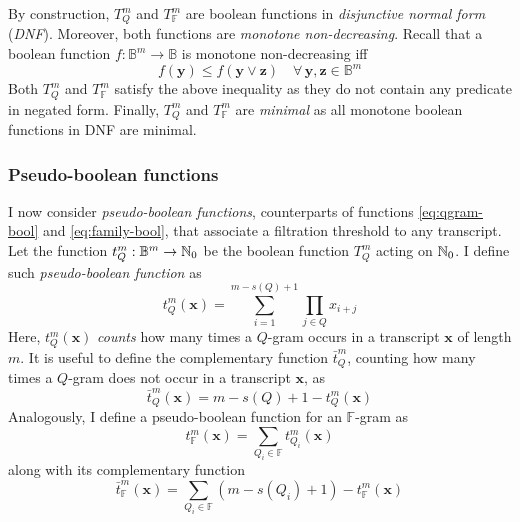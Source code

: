 By construction, $T_{Q}^{m}$ and $T_{\mathbb{F}}^{m}$ are boolean functions in \emph{disjunctive normal form} (\emph{DNF}).
Moreover, both functions are \emph{monotone non-decreasing}.
Recall that a boolean function $f : \mathbb{B}^m \rightarrow \mathbb{B}$ is monotone non-decreasing iff 
\begin{equation}
\label{eq:monotone-non-decreasing}
f(\mathbf{y}) \leq f(\mathbf{y} \vee \mathbf{z}) \quad \forall \, \mathbf{y}, \mathbf{z} \in \mathbb{B}^m
\end{equation}
Both $T_{Q}^{m}$ and $T_{\mathbb{F}}^{m}$ satisfy the above inequality as they do not contain any predicate in negated form.
Finally, $T_{Q}^{m}$ and $T_{\mathbb{F}}^{m}$ are \emph{minimal} as all monotone boolean functions in DNF are minimal.

\subsubsection{Pseudo-boolean functions}

I now consider \emph{pseudo-boolean functions}, counterparts of functions \ref{eq:qgram-bool} and \ref{eq:family-bool}, that associate a filtration threshold to any transcript.
Let the function $t_{Q}^{m}: \mathbb {B}^m \rightarrow \mathbb {N}_0$ be the boolean function $T_{Q}^{m}$ acting on $\mathbb {N}_0$.
I define such \emph{pseudo-boolean function} as
\begin{equation}
\label{eq:qgram-pseudo}
t_{Q}^{m}(\mathbf{x}) = \sum_{i=1}^{m-s(Q)+1} \prod_{j \in Q} x_{i+j}
\end{equation}
Here, $t_{Q}^{m}(\mathbf{x})$ \emph{counts} how many times a $Q$-gram occurs in a transcript $\mathbf{x}$ of length $m$.
It is useful to define the complementary function $\bar{t}_{Q}^{m}$, counting how many times a $Q$-gram does not occur in a transcript $\mathbf{x}$, as
\begin{equation}
\label{eq:qgram-pseudoneg}
\bar{t}_{Q}^{m}(\mathbf{x}) = m - s(Q) + 1 - t_{Q}^{m}(\mathbf{x})
\end{equation}
Analogously, I define a pseudo-boolean function for an $\mathbb{F}$-gram as
\begin{equation}
\label{eq:family-pseudo}
t_{\mathbb{F}}^{m}(\mathbf{x}) = \sum_{Q_i \in \mathbb{F}} t_{Q_i}^{m}(\mathbf{x})
\end{equation}
along with its complementary function
\begin{equation}
\label{eq:family-pseudoneg}
\bar{t}_{\mathbb{F}}^{m}(\mathbf{x}) = \sum_{Q_i \in \mathbb{F}}{(m - s(Q_i) + 1)} - t_{\mathbb{F}}^{m}(\mathbf{x})
\end{equation}

